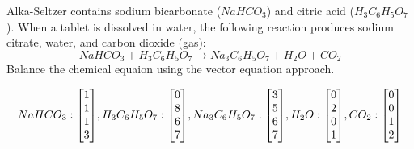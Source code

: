 \documentclass{../mathhomework}
\newenvironment{Mat}{\begin{bmatrix}}{\end{bmatrix}}
\begin{document}
\begin{problem}[1.6\#7]
    Alka-Seltzer contains sodium bicarbonate ($NaHCO_3$) and citric acid ($H_3C_6H_5O_7$). When a tablet is dissolved
    in water, the following reaction produces sodium citrate, water, and carbon dioxide (gas):
    \begin{equation*}
        NaHCO_3 + H_3C_6H_5O_7 \to Na_3C_6H_5O_7 + H_2O + CO_2
    \end{equation*}
    Balance the chemical equaion using the vector equation approach.

    \begin{solution}
        \begin{equation*}
            NaHCO_3: \begin{Mat}
                1 \\ 1 \\ 1 \\ 3
            \end{Mat},
            H_3C_6H_5O_7: \begin{Mat}
                0 \\ 8 \\ 6 \\ 7
            \end{Mat},
            Na_3C_6H_5O_7: \begin{Mat}
                3 \\ 5 \\ 6 \\ 7
            \end{Mat},
            H_2O: \begin{Mat}
                0 \\ 2 \\ 0 \\ 1
            \end{Mat},
            CO_2: \begin{Mat}
                0 \\ 0 \\ 1 \\ 2
            \end{Mat}
        \end{equation*}
    \end{solution}


\end{problem}
\end{document}
